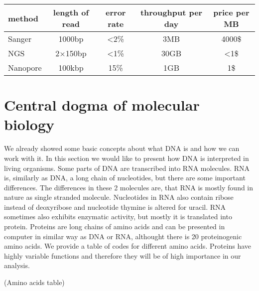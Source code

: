 \begin{center}
  \begin{tabular}{ | l | c | c | c | c | }
    \hline
    method & length of read & error rate & throughput per day & price per MB \\
    \hline
    Sanger & 1000bp & <2\% & 3MB & 4000\$ \\
    NGS & 2$\times$150bp & <1\% & 30GB & <1\$ \\
    Nanopore & 100kbp & 15\% & 1GB & 1\$ \\
    \hline
  \end{tabular}
\end{center}

\section{Central dogma of molecular biology}
We already showed some basic concepts about what DNA is and how we can work with it.
In this section we would like to present how DNA is interpreted in living organisms.
Some parts of DNA are transcribed into RNA molecules.
RNA is, similarly as DNA, a long chain of nucleotides, but there are some important differences.
The differences in these 2 molecules are, that RNA is mostly found in nature as single stranded molecule.
Nucleotides in RNA also contain ribose instead of deoxyribose and nucleotide thymine is altered for uracil.
RNA sometimes also exhibits enzymatic activity, but mostly it is translated into protein.
Proteins are long chains of amino acids and can be presented in computer in similar way as DNA or RNA, althought there is 20 proteinogenic amino acids.
We provide a table of codes for different amino acids.
Proteins have highly variable functions and therefore they will be of high importance in our analysis.

\medskip
(Amino acids table)
\medskip





